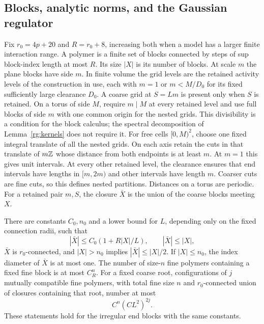 \subsection{Blocks, analytic norms, and the Gaussian regulator}

Fix $r_0=4p+20$ and $R=r_0+8$, increasing both when a model has a larger finite interaction range.  A polymer is a finite set of blocks connected by steps of sup block-index length at most $R$.  Its size $|X|$ is its number of blocks.  At scale $m$ the plane blocks have side $m$.  In finite volume the grid levels are the retained activity levels of the construction in use, each with $m=1$ or $m<M/D_0$ for its fixed sufficiently large clearance $D_0$.  A coarse grid at $S=Lm$ is present only when $S$ is retained.  On a torus of side $M$, require $m\mid M$ at every retained level and use full blocks of side $m$ with one common origin for the nested grids.  This divisibility is a condition for the block calculus; the spectral decomposition of Lemma~\ref{rg:kernels} does not require it.  For free cells $[0,M)^2$, choose one fixed integral translate of all the nested grids.  On each axis retain the cuts in that translate of $m\mathbb Z$ whose distance from both endpoints is at least $m$.  At $m=1$ this gives unit intervals.  At every other retained level, the clearance ensures that end intervals have lengths in $[m,2m)$ and other intervals have length $m$.  Coarser cuts are fine cuts, so this defines nested partitions.  Distances on a torus are periodic.  For a retained pair $m,S$, the closure $\bar X$ is the union of the coarse blocks meeting $X$.

\begin{lemma}\label{rg:geometry}
There are constants $C_0,n_0$ and a lower bound for $L$, depending only on the fixed connection radii, such that
\begin{equation}\label{rg:closure}
 |\bar X|\le C_0(1+R|X|/L),\qquad |\bar X|\le |X|,
\end{equation}
$\bar X$ is $r_0$-connected, and $|X|>n_0$ implies $|\bar X|\le|X|/2$.  If $|X|\le n_0$, the index diameter of $\bar X$ is at most one.  The number of size-$n$ fine polymers containing a fixed fine block is at most $C_R^n$.  For a fixed coarse root, configurations of $j$ mutually compatible fine polymers, with total fine size $n$ and $r_0$-connected union of closures containing that root, number at most
\begin{equation}\label{rg:family-count}
 C^n(CL^2)^{2j}.
\end{equation}
These statements hold for the irregular end blocks with the same constants.
\end{lemma}

